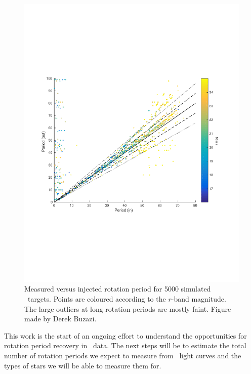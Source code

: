 \begin{figure}
\begin{center}
\includegraphics[width=6in, clip=true]{figures/figure8.pdf}
\caption[\LSST\ rotation period recovery results.]
{Measured versus injected rotation period for 5000 simulated \LSST\ targets.
Points are coloured according to the $r$-band magnitude.
The large outliers at long rotation periods are mostly faint.
Figure made by Derek Buzazi.}
\label{fig:derek2}
\end{center}
\end{figure}

This work is the start of an ongoing effort to understand the opportunities
for rotation period recovery in \LSST\ data.
The next steps will be to estimate the total number of rotation periods we
expect to measure from \LSST\ light curves and the types of stars we will be
able to measure them for.
